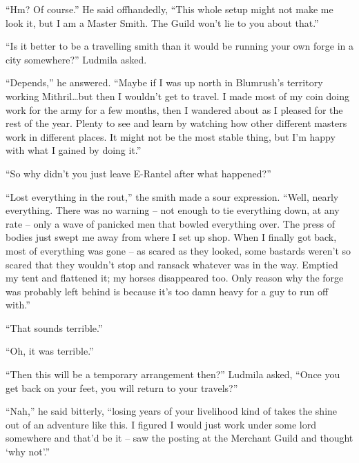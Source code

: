  

“Hm? Of course.” He said offhandedly, “This whole setup might not make me look it, but I am a Master Smith. The Guild won’t lie to you about that.”

 

“Is it better to be a travelling smith than it would be running your own forge in a city somewhere?” Ludmila asked.

 

“Depends,” he answered. “Maybe if I was up north in Blumrush’s territory working Mithril…but then I wouldn’t get to travel. I made most of my coin doing work for the army for a few months, then I wandered about as I pleased for the rest of the year. Plenty to see and learn by watching how other different masters work in different places. It might not be the most stable thing, but I’m happy with what I gained by doing it.”

 

“So why didn’t you just leave E-Rantel after what happened?”

 

“Lost everything in the rout,” the smith made a sour expression. “Well, nearly everything. There was no warning – not enough to tie everything down, at any rate – only a wave of panicked men that bowled everything over. The press of bodies just swept me away from where I set up shop. When I finally got back, most of everything was gone – as scared as they looked, some bastards weren’t so scared that they wouldn’t stop and ransack whatever was in the way. Emptied my tent and flattened it; my horses disappeared too. Only reason why the forge was probably left behind is because it’s too damn heavy for a guy to run off with.”

 

“That sounds terrible.”

 

“Oh, it was terrible.”

 

“Then this will be a temporary arrangement then?” Ludmila asked, “Once you get back on your feet, you will return to your travels?”

 

“Nah,” he said bitterly, “losing years of your livelihood kind of takes the shine out of an adventure like this. I figured I would just work under some lord somewhere and that’d be it – saw the posting at the Merchant Guild and thought ‘why not’.”

 

